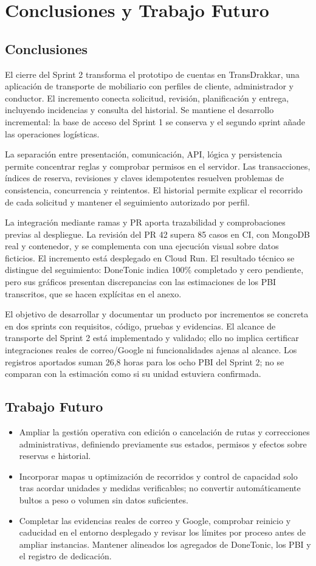 \chapter{Conclusiones y Trabajo Futuro}
\section{Conclusiones}
El cierre del Sprint 2 transforma el prototipo de cuentas en TransDrakkar, una aplicación de transporte de mobiliario con perfiles de cliente, administrador y conductor. El incremento conecta solicitud, revisión, planificación y entrega, incluyendo incidencias y consulta del historial. Se mantiene el desarrollo incremental: la base de acceso del Sprint 1 se conserva y el segundo sprint añade las operaciones logísticas.

La separación entre presentación, comunicación, API, lógica y persistencia permite concentrar reglas y comprobar permisos en el servidor. Las transacciones, índices de reserva, revisiones y claves idempotentes resuelven problemas de consistencia, concurrencia y reintentos. El historial permite explicar el recorrido de cada solicitud y mantener el seguimiento autorizado por perfil.

La integración mediante ramas y PR aporta trazabilidad y comprobaciones previas al despliegue. La revisión del PR 42 supera 85 casos en CI, con MongoDB real y contenedor, y se complementa con una ejecución visual sobre datos ficticios. El incremento está desplegado en Cloud Run. El resultado técnico se distingue del seguimiento: DoneTonic indica 100\% completado y cero pendiente, pero sus gráficos presentan discrepancias con las estimaciones de los PBI transcritos, que se hacen explícitas en el anexo.

El objetivo de desarrollar y documentar un producto por incrementos se concreta en dos sprints con requisitos, código, pruebas y evidencias. El alcance de transporte del Sprint 2 está implementado y validado; ello no implica certificar integraciones reales de correo/Google ni funcionalidades ajenas al alcance. Los registros aportados suman 26,8 horas para los ocho PBI del Sprint 2; no se comparan con la estimación como si su unidad estuviera confirmada.

\section{Trabajo Futuro}
\begin{itemize}
\item Ampliar la gestión operativa con edición o cancelación de rutas y correcciones administrativas, definiendo previamente sus estados, permisos y efectos sobre reservas e historial.
\item Incorporar mapas u optimización de recorridos y control de capacidad solo tras acordar unidades y medidas verificables; no convertir automáticamente bultos a peso o volumen sin datos suficientes.
\item Completar las evidencias reales de correo y Google, comprobar reinicio y caducidad en el entorno desplegado y revisar los límites por proceso antes de ampliar instancias. Mantener alineados los agregados de DoneTonic, los PBI y el registro de dedicación.
\end{itemize}
